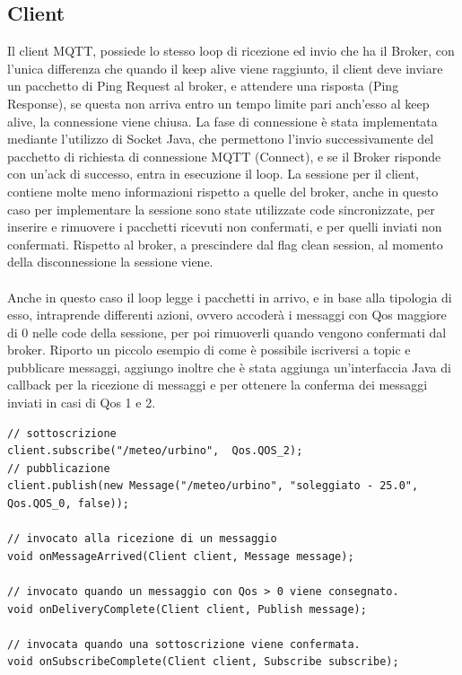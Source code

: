 \documentclass{article}
\begin{document}
\subsection{Client}
Il client MQTT, possiede lo stesso loop di ricezione ed invio che ha il Broker, con l'unica differenza che quando il keep alive viene raggiunto, il client deve inviare un pacchetto di Ping Request al broker, e attendere una risposta (Ping Response), se questa non arriva entro un tempo limite pari anch'esso al keep alive, la connessione viene chiusa. La fase di connessione è stata implementata mediante l'utilizzo di Socket Java, che permettono l'invio successivamente del pacchetto di richiesta di connessione MQTT (Connect), e se il Broker risponde con un'ack di successo, entra in esecuzione il loop. La sessione per il client, contiene molte meno informazioni rispetto a quelle del broker, anche in questo caso per implementare la sessione sono state utilizzate code sincronizzate, per inserire e rimuovere i pacchetti ricevuti non confermati, e per quelli inviati non confermati. Rispetto al broker, a prescindere dal flag clean session, al momento della disconnessione la sessione viene.\\\\ Anche in questo caso il loop legge i pacchetti in arrivo, e in base alla tipologia di esso, intraprende differenti azioni, ovvero accoderà i messaggi con Qos maggiore di 0 nelle code della sessione, per poi rimuoverli quando vengono confermati dal broker. Riporto un piccolo esempio di come è possibile iscriversi a topic e pubblicare messaggi, aggiungo inoltre che è stata aggiunga un'interfaccia Java di callback per la ricezione di messaggi e per ottenere la conferma dei messaggi inviati in casi di Qos 1 e 2.
\begin{lstlisting}[style=JavaStyle]
// sottoscrizione
client.subscribe("/meteo/urbino",  Qos.QOS_2);
// pubblicazione
client.publish(new Message("/meteo/urbino", "soleggiato - 25.0", Qos.QOS_0, false));

// invocato alla ricezione di un messaggio
void onMessageArrived(Client client, Message message);

// invocato quando un messaggio con Qos > 0 viene consegnato.
void onDeliveryComplete(Client client, Publish message);

// invocata quando una sottoscrizione viene confermata.
void onSubscribeComplete(Client client, Subscribe subscribe);

\end{lstlisting}
\end{document}
